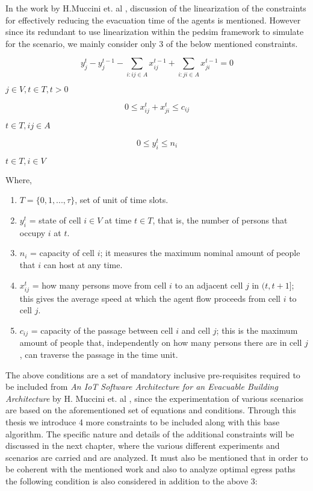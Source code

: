 In the work by H.Muccini et. al \cite{ref5}, discussion of the linearization of the constraints for effectively reducing the evacuation time of the agents is mentioned. However since its redundant to use linearization within the pedsim framework to simulate for the scenario, we mainly consider only 3 of the below mentioned constraints.

\begin{equation}\label{eq1}
    y^t_j-y^{t-1}_j-\sum_{i:ij\in A}x^{t-1}_{ij}+\sum_{i:ji\in A}x^{t-1}_{ji}=0
\end{equation}

\hspace{100mm} $j\in V,t\in T,t>0$

\begin{equation}\label{eq2}
  0\leq x^t_{ij}+x^t_{ji}\leq c_{ij}
\end{equation}

\hspace{100mm} $t\in T,ij\in A$

\begin{equation}\label{eq3}
  0\leq y^t_i\leq n_i
\end{equation}

\hspace{100mm} $t\in T,i\in V$

Where,

\begin{enumerate}
  \item $T=\{0,1,...,\tau\}$, set of unit of time slots.
  \item $y^t_i$ = state of cell $i\in V$ at time $t\in T$, that is, the number of persons that occupy $i$ at $t$.
  \item $n_i$ = capacity of cell $i$; it measures the maximum nominal amount of people that $i$ can host at any time.
  \item $x^t_{ij}$ = how many persons move from cell $i$ to an adjacent cell $j$ in $(t, t+1]$; this gives the average speed at which the agent flow proceeds from cell $i$ to cell $j$.
  \item $c_{ij}$ = capacity of the passage between cell $i$ and cell $j$; this is the maximum amount of people that, independently on how many persons there are in cell $j$, can traverse the passage in the time unit.
\end{enumerate}

The above conditions are a set of mandatory inclusive pre-requisites required to be included from \textit{An IoT Software Architecture for an Evacuable Building Architecture} by H. Muccini et. al \cite{ref5}, since the experimentation of various scenarios are based on the aforementioned set of equations and conditions. Through this thesis we introduce 4 more constraints to be included along with this base algorithm. The specific nature and details of the additional constraints will be discussed in the next chapter, where the various different experiments and scenarios are carried and are analyzed. It must also be mentioned that in order to be coherent with the mentioned work and also to analyze optimal egress paths the following condition is also considered in addition to the above 3:


